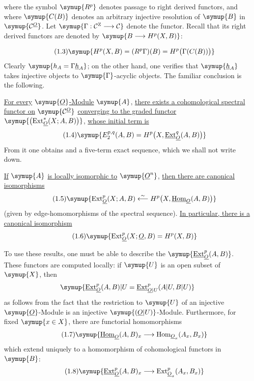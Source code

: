 where the symbol $\symup{R^{p}}$ denotes passage to right derived functors, and where
$\symup{C(B)}$ denotes an arbitrary injective resolution of $\symup{B}$ in $\symup{\Ccat^{\Osh}}$. Let
$\symup{\Gamma:\Ccat^{\mathrm Z}\longrightarrow\Ccat}$
denote the  functor. Recall that its right derived functors are
denoted by
$\symup{B\longrightarrow H^{p}(X,B)}$:

\begin{equation}\tag{1.3}
  \symup{H^{p}(X,B)=(R^{p}\Gamma)(B)=H^{p}\bigl(\Gamma(C(B))\bigr)}
\end{equation}
Clearly $\symup{h_A=\Gamma\hsh_A}$; on the other hand, one verifies that $\symup{\hsh_A}$
takes injective objects to $\symup{\Gamma}$-acyclic objects. The familiar conclusion is
the following.

 \uline{For every} $\symup{\Osh}$\uline{-Module} $\symup{A}$, \uline{there exists a
cohomological spectral functor on} $\symup{\Ccat^{\Osh}}$ \uline{converging to the graded functor}
$\symup{\bigl(\operatorname{Ext}_{\Osh}^{*}(X;A,B)\bigr)}$, \uline{whose initial term is}
\begin{equation}\tag{1.4}
  \symup{E_{2}^{p,q}(A,B)=H^{p}\bigl(X,\Extsh_{\Osh}^{q}(A,B)\bigr)}
\end{equation}
From it one obtains  and a five-term exact sequence, which we
shall not write down.

 \uline{If} $\symup{A}$ \uline{is locally isomorphic to} $\symup{\Osh^{n}}$, \uline{then there are
canonical isomorphisms}
\begin{equation}\tag{1.5}
  \symup{\operatorname{Ext}_{\Osh}^{p}(X;A,B)
  \overset{\sim}{\longleftarrow}
  H^{p}\bigl(X,\Homsh_{\Osh}(A,B)\bigr)}
\end{equation}
(given by edge-homomorphisms of the spectral sequence). \uline{In particular, there is
a canonical isomorphism}
\begin{equation}\tag{1.6}
  \symup{\operatorname{Ext}_{\Osh}^{p}(X;\Osh,B)=H^{p}(X,B)}
\end{equation}

To use these results, one must be able to describe the
$\symup{\Extsh_{\Osh}^{p}(A,B)}$. These functors are computed locally: if $\symup{U}$ is an open
subset of $\symup{X}$, then
\[
  \symup{\Extsh_{\Osh}^{p}(A,B)|U
  =\Extsh_{\Osh|U}^{p}(A|U,B|U)}
\]
as follows from the fact that the restriction to $\symup{U}$ of an injective
$\symup{\Osh}$-Module is an injective $\symup{(\Osh|U)}$-Module. Furthermore, for fixed
$\symup{x\in X}$, there are functorial homomorphisms
\begin{equation}\tag{1.7}
  \symup{\Homsh_{\Osh}(A,B)_x
  \longrightarrow
  \operatorname{Hom}_{\Osh_x}(A_x,B_x)}
\end{equation}
which extend uniquely to a homomorphism of cohomological functors in $\symup{B}$:
\begin{equation}\tag{1.8}
  \symup{\Extsh_{\Osh}^{p}(A,B)_x
  \longrightarrow
  \operatorname{Ext}_{\Osh_x}^{p}(A_x,B_x)}
\end{equation}

